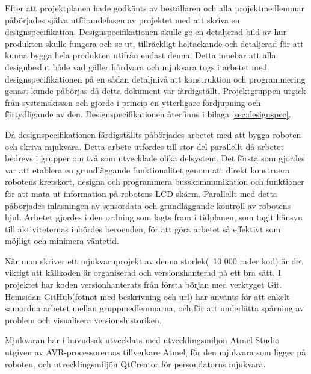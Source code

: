 Efter att projektplanen hade godkänts av beställaren och alla projektmedlemmar påbörjades själva utförandefasen av projektet med att skriva en designspecifikation. Designspecifikationen skulle ge en detaljerad bild av hur produkten skulle fungera och se ut, tillräckligt heltäckande och detaljerad för att kunna bygga hela produkten utifrån endast denna. Detta innebar att alla designbeslut både vad gäller hårdvara och mjukvara togs i arbetet med designspecifikationen på en sådan detaljnivå att konstruktion och programmering genast kunde påbörjas då detta dokument var färdigställt. Projektgruppen utgick från systemskissen och gjorde i princip en ytterligare fördjupning och förtydligande av den. Designspecifikationen återfinns i bilaga \ref{sec:designspec}.

Då designspecifikationen färdigställts påbörjades arbetet med att bygga roboten och skriva mjukvara. Detta arbete utfördes till stor del parallellt då arbetet bedrevs i grupper om två som utvecklade olika delsystem. Det första som gjordes var att etablera en grundläggande funktionalitet genom att direkt konstruera robotens kretskort, designa och programmera busskommunikation och funktioner för att mata ut information på robotens LCD-skärm. Parallellt med detta påbörjades inläsningen av sensordata och grundläggande kontroll av robotens hjul. Arbetet gjordes i den ordning som lagts fram i tidplanen, som tagit hänsyn till aktiviteternas inbördes beroenden, för att göra arbetet så effektivt som möjligt och minimera väntetid. 

När man skriver ett mjukvaruprojekt av denna storlek(~10 000 rader kod) är det viktigt att källkoden är organiserad och versionshanterad på ett bra sätt. I projektet har koden versionhanterats från första början med verktyget Git. Hemsidan GitHub(fotnot med beskrivning och url) har använts för att enkelt samordna arbetet mellan gruppmedlemmarna, och för att underlätta spårning av problem och visualisera versionshistoriken.

Mjukvaran har i huvudsak utvecklats med utvecklingsmiljön Atmel Studio utgiven av AVR-processorernas tillverkare Atmel, för den mjukvara som ligger på roboten, och utvecklingsmiljön QtCreator för persondatorns mjukvara.